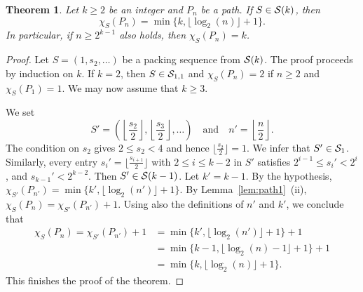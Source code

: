 \documentclass[12pt]{article}
\newtheorem{theorem}{Theorem}[section]
\newcommand{\cS}{{\cal S}}
\begin{document}
\begin{theorem}  \label{thm:path}
    Let $k \ge 2$ be an integer and $P_n$ be a path. If $S \in \cS(k)$, then 
    \begin{equation*} 
         \chi_S(P_n)= \min \{k,\lfloor \log_2(n) \rfloor +1\}.
    \end{equation*}   
    In particular, if $n \ge 2^{k-1}$ also holds, then $\chi_S(P_n)=k$. 
\end{theorem}
\begin{proof} Let $S=(1, s_2, \dots)$ be a packing sequence from $\cS(k)$. 
    The proof proceeds by induction on $k$. If $k=2$, then $S \in \cS_{1,1}$ and $ \chi_S(P_n)= 2$ if $n\ge 2$ and $ \chi_S(P_1)= 1$. We may now assume that $k \ge 3$.

    We set 
    $$ S'=\left( \left\lfloor \frac{s_2}{2} \right\rfloor, \left\lfloor \frac{s_3}{2} \right\rfloor, \dots \right) \quad \mbox{and} \quad n'= \left\lfloor \frac{n}{2} \right\rfloor.
    $$
    The condition  on  $s_2$  gives $2 \le s_2 <4$  and hence $\lfloor \frac{s_2}{2} \rfloor =1$. We infer that $S' \in \cS_1$. Similarly,  every entry $s_i'=\lfloor \frac{s_{i+1}}{2} \rfloor$ with $2 \le i \le k-2$ in $S'$ satisfies $2^{i-1} \leq s_i' < 2^i$, and $s_{k-1}' <2^{k-2}$. Then $S' \in \cS(k-1)$. Let $k'=k-1$. By the hypothesis, $\chi_{S'}(P_{n'})= \min \{k', \lfloor \log_2(n') \rfloor +1 \}$.       By Lemma~\ref{lem:path1}~(ii), $\chi_{S}(P_{n})= \chi_{S'}(P_{n'})+1$. Using also the definitions of $n'$ and $k'$, we conclude that
    \begin{align*}
        \chi_{S}(P_{n}) = \chi_{S'}(P_{n'})+1 &=\min \{k', \lfloor \log_2(n') \rfloor +1 \}+1\\
        &=  \min \{k-1, \lfloor \log_2(n)-1 \rfloor +1 \}+1\\
        &= \min \{k, \lfloor \log_2(n) \rfloor +1\}.
    \end{align*}
    This finishes the proof of the theorem.
\end{proof}
\end{document}
